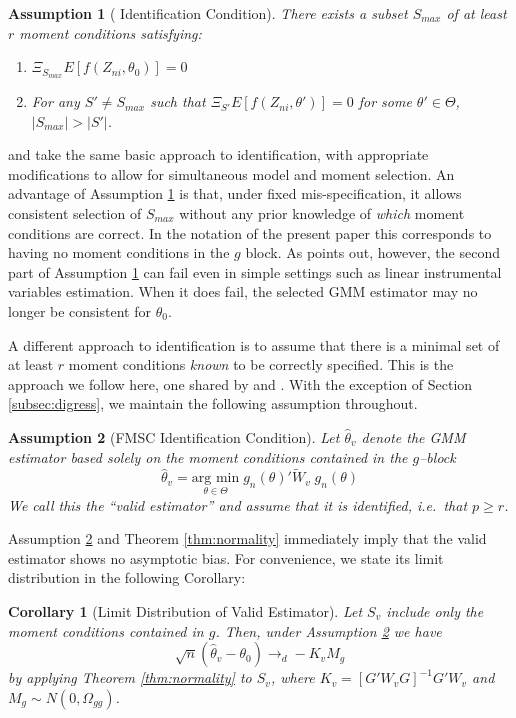 \documentclass[12pt]{article}
\newtheorem{assump}{Assumption}[section]
\newtheorem{cor}{Corollary}[section]
\theoremstyle{definition}
\begin{document}
\begin{assump}[\cite{Andrews1999} Identification Condition]
	\label{assump:Andrews}
There exists a subset $S_{max}$ of at least $r$ moment conditions satisfying:
	\begin{enumerate}
	 	\item $\Xi_{S_{max}} E[f(Z_{ni},\theta_0)]= 0$
	 	\item For any $S' \neq S_{max}$ such that $\Xi_{S'} E[f(Z_{ni},\theta')]= 0$ for some $\theta' \in \Theta$, $|S_{max}| > |S'|$.
	 \end{enumerate}
\end{assump}

\cite{AndrewsLu} and \cite{HongPrestonShum} take the same basic approach to identification, with appropriate modifications to allow for simultaneous model and moment selection. 
An advantage of Assumption \ref{assump:Andrews} is that, under fixed mis-specification, it allows consistent selection of $S_{max}$ without any prior knowledge of \emph{which} moment conditions are correct. 
In the notation of the present paper this corresponds to having no moment conditions in the $g$ block. As \citet[p.\ 254]{Hallbook} points out, however, the second part of Assumption \ref{assump:Andrews} can fail even in simple settings such as linear instrumental variables estimation. 
When it does fail, the selected GMM estimator may no longer be consistent for $\theta_0$. 

A different approach to identification is to assume that there is a minimal set of at least $r$ moment conditions \emph{known} to be correctly specified.
This is the approach we follow here, one shared by \cite{Liao} and \cite{ChengLiao}. 
With the exception of Section \ref{subsec:digress}, we maintain the following assumption throughout.

\begin{assump}[FMSC Identification Condition] 
\label{assump:Identification}
Let $\widehat{\theta}_v$ denote the GMM estimator based solely on the moment conditions contained in the $g$--block
$$\widehat{\theta}_v = \underset{\theta \in \Theta}{\mbox{arg min}}\; g_n(\theta)' \widetilde{W}_{v} \; g_n(\theta)$$
We call this the ``valid estimator'' and assume that it is identified, i.e.\ that $p\geq r$.
\end{assump}

Assumption \ref{assump:Identification} and Theorem \ref{thm:normality} immediately imply that the valid estimator shows no asymptotic bias. 
For convenience, we state its limit distribution in the following Corollary: 
\begin{cor}[Limit Distribution of Valid Estimator]
	\label{cor:valid}
	Let $S_{v}$ include only the moment conditions contained in $g$. 
	Then, under Assumption \ref{assump:Identification} we have
		$$\sqrt{n}\left(\widehat{\theta}_v - \theta_0\right) \rightarrow_d -K_v M_g$$
	by applying Theorem \ref{thm:normality} to $S_{v}$, where $K_v = [G'W_vG]^{-1}G'W_v$ and $M_g \sim N(0,\Omega_{gg})$. 
\end{cor}
\end{document}
